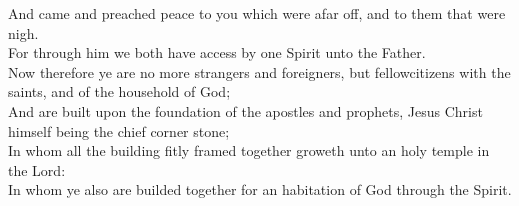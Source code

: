 \documentclass[10pt]{article} %
\begin{document}
{\begin{minipage}[t]{0.45\textwidth}
And came and preached peace to you which were afar off, and to them that were nigh.\\
For through him we both have access by one Spirit unto the Father.\\
Now therefore ye are no more strangers and foreigners, but fellowcitizens with the saints, and of the household of God;\\
And are built upon the foundation of the apostles and prophets, Jesus Christ himself being the chief corner stone;\\
In whom all the building fitly framed together groweth unto an holy temple in the Lord:\\
In whom ye also are builded together for an habitation of God through the Spirit.
\end{minipage}}
\vspace*{\fill}
\newpage
\Huge%
\vspace*{\fill}
\begin{spacing}{1.2}%
\end{spacing}
\vspace*{\fill}
\end{document}
